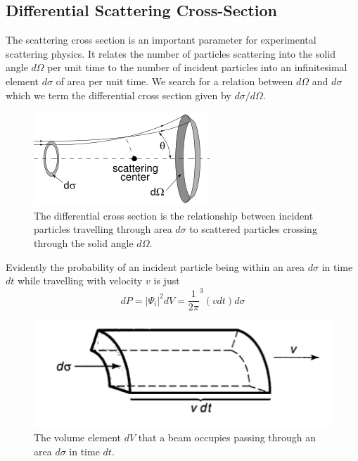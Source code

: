 \subsection{Differential Scattering Cross-Section}
The scattering cross section is an important parameter for experimental scattering physics. It relates the number of particles scattering into the solid angle $d\Omega$ per unit time to the number of incident particles into an infinitesimal element $d\sigma$ of area per unit time. We search for a relation between $d\Omega$ and $d\sigma$ which we term the differential cross section given by $d\sigma/d\Omega$.\cite{sakurai}
\begin{figure}[ht!]
\centering
\includegraphics[scale=1.0]{Figures/scatteringCrossSection.png}
\caption{The differential cross section is the relationship between incident particles travelling through area $d\sigma$ to scattered particles crossing through the solid angle $d\Omega$. \cite{sakurai}}
\label{fig:scatteringCrossSection}
\end{figure}
Evidently the probability of an incident particle being within an area $d\sigma$ in time $dt$ while travelling with velocity $v$ is just \cite{griffiths}
\begin{equation}
dP = \left|\Psi_i\right|^2 dV  = \frac{1}{2\pi}^3 (vdt)d\sigma
\label{eq:incidentCross}
\end{equation}

\begin{figure}[ht!]
\centering
\includegraphics[scale=0.7]{Figures/incidentBeam.png}
\caption{The volume element $dV$ that a beam occupies passing through an area $d\sigma$ in time $dt$. \cite{griffiths}}
\label{fig:incidentBeam}
\end{figure}

